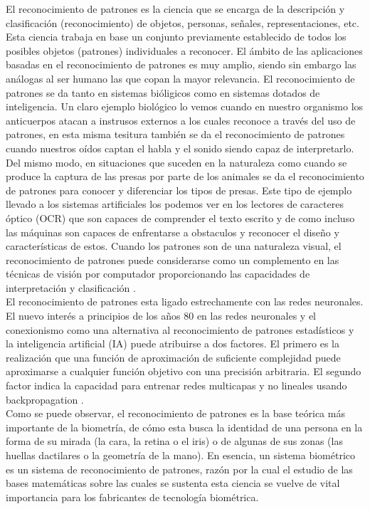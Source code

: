 El reconocimiento de patrones es la ciencia que se encarga de la descripción y clasificación (reconocimiento) de objetos, personas, señales, representaciones, etc. Esta ciencia trabaja en base un conjunto previamente establecido de todos los posibles objetos (patrones) individuales a reconocer. El ámbito de las aplicaciones basadas en el reconocimiento de patrones es muy amplio, siendo sin embargo las análogas al ser humano las que copan la mayor relevancia. El reconocimiento de patrones se da tanto en sistemas bióligicos como en sistemas dotados de inteligencia. Un claro ejemplo biológico lo vemos cuando en nuestro organismo los anticuerpos atacan a instrusos externos a los cuales reconoce a través del uso de patrones, en esta misma tesitura también se da el reconocimiento de patrones cuando nuestros oídos captan el habla y el sonido siendo capaz de interpretarlo. Del mismo modo, en situaciones que suceden en la naturaleza como cuando se produce la captura de las presas por parte de los animales se da el reconocimiento de patrones para conocer y diferenciar los tipos de presas. Este tipo de ejemplo llevado a los sistemas artificiales los podemos ver en los lectores de caracteres óptico (OCR) que son capaces de comprender el texto escrito y de como incluso las máquinas son capaces de enfrentarse a obstaculos y reconocer el diseño y características de estos. Cuando los patrones son de una naturaleza visual, el reconocimiento de patrones puede considerarse como un complemento en las técnicas de visión por computador proporcionando las capacidades de interpretación y clasificación \cite{Reference8}. \\

El reconocimiento de patrones esta ligado estrechamente con las redes neuronales. El nuevo interés a principios de los años 80 en las redes neuronales y el conexionismo como una alternativa al reconocimiento de patrones estadísticos y la inteligencia artificial (IA) puede atribuirse a dos factores. El primero es la realización que una función de aproximación de suficiente complejidad puede aproximarse a cualquier función objetivo con una precisión arbitraria. El segundo factor indica la capacidad para entrenar redes multicapas y no lineales usando backpropagation \cite{Reference8}. \\

Como se puede observar, el reconocimiento de patrones es la base teórica más importante de la biometría, de cómo esta busca la identidad de una persona en la forma de su mirada (la cara, la retina o el iris) o de algunas de sus zonas (las huellas dactilares o la geometría de la mano). En esencia, un sistema biométrico es un sistema de reconocimiento de patrones, razón por la cual el estudio de las bases matemáticas sobre las cuales se sustenta esta ciencia se vuelve de vital importancia para los fabricantes de tecnología biométrica. \\



